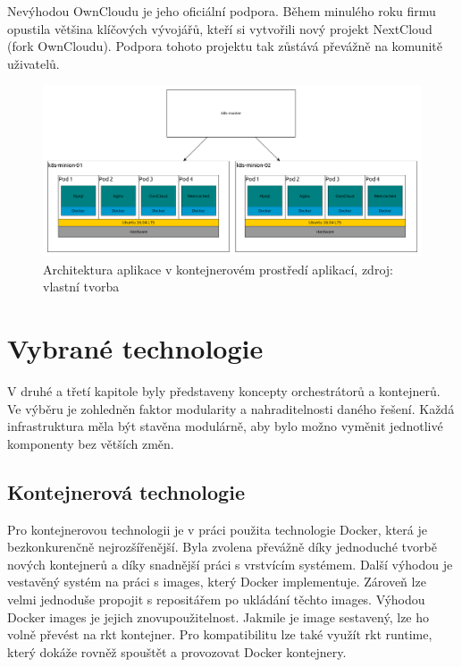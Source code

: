 Nevýhodou OwnCloudu je jeho oficiální podpora. Během minulého roku firmu opustila většina klíčových vývojářů, kteří si vytvořili nový projekt NextCloud (fork OwnCloudu). Podpora tohoto projektu tak zůstává převážně na komunitě uživatelů.


\begin{figure}[H]
\begin{centering}
\includegraphics[width=1\textwidth]{img/k8schema}
\par\end{centering}
\caption{Architektura aplikace v kontejnerovém prostředí aplikací, zdroj: vlastní tvorba \label{fig:k8schema}}
\end{figure}


\section{Vybrané technologie}
V druhé a třetí kapitole byly představeny koncepty orchestrátorů a kontejnerů. Ve výběru je zohledněn faktor modularity a nahraditelnosti daného řešení. Každá infrastruktura měla být stavěna modulárně, aby bylo možno vyměnit jednotlivé komponenty bez větších změn.

\subsection{Kontejnerová technologie}
Pro kontejnerovou technologii je v práci použita technologie Docker, která je bezkonkurenčně nejrozšířenější. Byla zvolena převážně díky jednoduché tvorbě nových kontejnerů a díky snadnější práci s vrstvícím systémem. Další výhodou je vestavěný systém na práci s images, který Docker implementuje. Zároveň lze velmi jednoduše propojit s repositářem po ukládání těchto images.
Výhodou Docker images je jejich znovupoužitelnost. Jakmile je image sestavený, lze ho volně převést na rkt kontejner. Pro kompatibilitu lze také využít rkt runtime, který dokáže rovněž spouštět a provozovat Docker kontejnery. 

